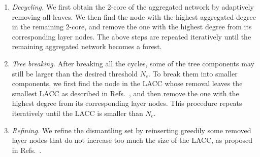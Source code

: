 \documentclass[%
 aip,
 cha,
 amsmath,amssymb,
 reprint,%
]{revtex4-1}
\begin{document}
\begin{enumerate}
    \item \emph{Decycling.} We first obtain the 2-core of the aggregated network by adaptively removing all leaves. We then find the node with the highest aggregated degree in the remaining 2-core, and remove the one with the highest degree from its corresponding layer nodes. The above steps are repeated iteratively until the remaining aggregated network becomes a forest.
    \item \emph{Tree breaking.} After breaking all the cycles, some of the tree components may still be larger than the desired threshold $N_c$. To break them into smaller components, we first find the node in the LACC whose removal leaves the smallest LACC as described in Refs.~, and then remove the one with the highest degree from its corresponding layer nodes. This procedure repeats iteratively until the LACC is smaller than $N_c$.
    \item \emph{Refining.} We refine the dismantling set by reinserting greedily some removed layer nodes that do not increase too much the size of the LACC, as proposed in Refs.~.
\end{enumerate}

\end{document}
